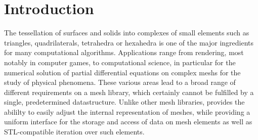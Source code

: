 
\chapter*{Introduction}    \label{intro}

The tessellation of surfaces and solids into complexes of small elements such as triangles, quadrilaterals, tetrahedra or hexahedra is one of the major
ingredients for many computational algorithms. Applications range from rendering, most notably in computer games, to computational science, in particular for the numerical solution of partial differential equations on complex meshs for the study of physical phenomena. These various areas lead to a broad range of different requirements on a mesh library, which certainly cannot be fulfilled by a single, predetermined datastructure. Unlike other mesh libraries, {\ViennaGrid} provides the abililty to easily adjust the internal representation of meshes, while providing a uniform interface for the storage and access of data on mesh elements as well as STL-compatible iteration over such elements.

